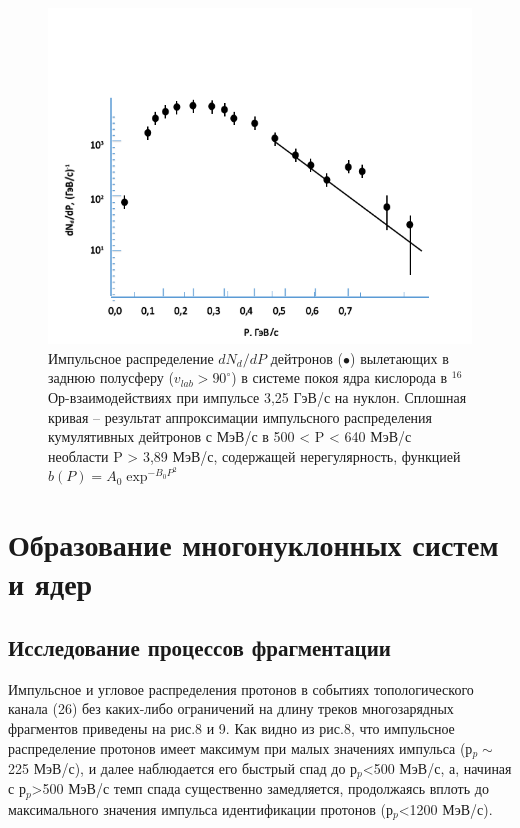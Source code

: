 \documentclass[fontsize=14pt]{scrreport}
\begin{document}
\begin{figure}[!ht]
\centerline{\includegraphics[scale=.95]{picture6.png}}
\caption{Импульсное распределение $dN_{d}/dP$ дейтронов ($\bullet$) вылетающих в заднюю полусферу ($v_{lab}>90^{\circ}$) в системе покоя ядра кислорода в $^{16}$Ор-взаимодействиях при импульсе 3,25 ГэВ/с на нуклон. Сплошная кривая – результат аппроксимации импульсного распределения кумулятивных дейтронов с  МэВ/с в 500 < P < 640 МэВ/с необласти P > 3,89 МэВ/с, содержащей нерегулярность, функцией $b(P) = A_{0}\exp^{-B_{0}P^{2}}$ }
\label{fig26}
\end{figure}

\chapter{Образование многонуклонных систем и ядер }
\section{Исследование процессов фрагментации }
\hspace{0.6cm}
Импульсное и угловое распределения протонов в событиях топологического канала (26) без каких-либо ограничений на длину треков многозарядных фрагментов приведены на рис.8 и 9. Как видно из рис.8, что импульсное распределение протонов имеет максимум при малых значениях импульса (р$_{p}\sim$225 МэВ/с), и далее наблюдается его быстрый спад до р$_{p}$<500 МэВ/с, а, начиная с р$_{p}$>500 МэВ/с темп спада существенно замедляется, продолжаясь вплоть до максимального значения импульса идентификации протонов (р$_{p}$<1200 МэВ/с).
\end{document}
